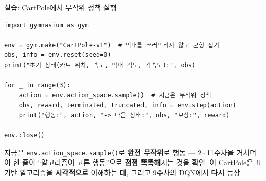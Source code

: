 \begin{frame}[fragile]{실습: CartPole에서 무작위 정책 실행}
\begin{lstlisting}
import gymnasium as gym

env = gym.make("CartPole-v1")  # 막대를 쓰러뜨리지 않고 균형 잡기
obs, info = env.reset(seed=0)
print("초기 상태(카트 위치, 속도, 막대 각도, 각속도):", obs)

for _ in range(3):
    action = env.action_space.sample()  # 지금은 무작위 정책
    obs, reward, terminated, truncated, info = env.step(action)
    print("행동:", action, "-> 다음 상태:", obs, "보상:", reward)

env.close()
\end{lstlisting}
  {\footnotesize 지금은 \texttt{env.action\_space.sample()}로
  \textbf{완전 무작위}로 행동 --- 2$\sim$11주차을 거치며 이 한 줄이
  ``알고리즘이 고른 행동''으로 \textbf{점점 똑똑해}지는 것을 확인.
  이 CartPole은 표 기반 알고리즘을 \textbf{시각적으로} 이해하는 데,
  그리고 9주차의 DQN에서 \textbf{다시} 등장.}
\end{frame}
